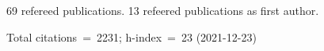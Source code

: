 69 refereed publications. 13 refeered publications as first author.

Total citations~=~2231; h-index~=~23 (2021-12-23)